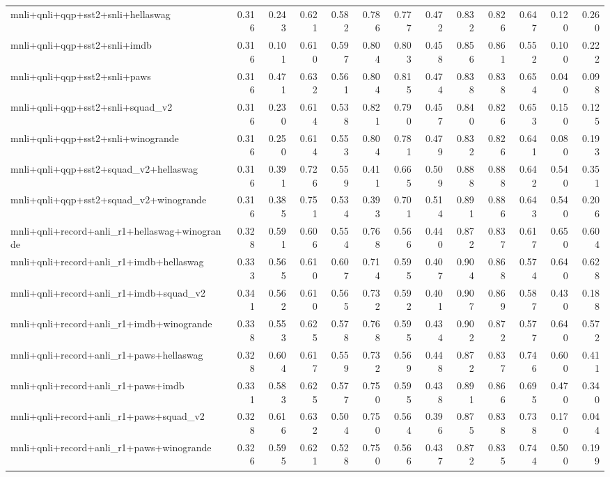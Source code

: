 \begin{table}[t]
\begin{tabular}{lrrrrrrrrrrrr}
    mnli+qnli+qqp+sst2+snli+hellaswag & 0.316 & 0.243 & 0.621 & 0.582 & 0.786 & 0.777 & 0.472 & 0.832 & 0.826 & 0.647 & 0.120 & 0.260 \\
    mnli+qnli+qqp+sst2+snli+imdb & 0.316 & 0.101 & 0.610 & 0.597 & 0.804 & 0.803 & 0.458 & 0.856 & 0.861 & 0.552 & 0.100 & 0.222 \\
    mnli+qnli+qqp+sst2+snli+paws & 0.316 & 0.471 & 0.632 & 0.561 & 0.804 & 0.815 & 0.474 & 0.838 & 0.838 & 0.654 & 0.040 & 0.098 \\
    mnli+qnli+qqp+sst2+snli+squad\_v2 & 0.316 & 0.230 & 0.614 & 0.538 & 0.821 & 0.790 & 0.457 & 0.840 & 0.826 & 0.653 & 0.150 & 0.125 \\
    mnli+qnli+qqp+sst2+snli+winogrande & 0.316 & 0.250 & 0.614 & 0.553 & 0.804 & 0.781 & 0.479 & 0.832 & 0.826 & 0.641 & 0.080 & 0.193 \\
    mnli+qnli+qqp+sst2+squad\_v2+hellaswag & 0.316 & 0.391 & 0.726 & 0.559 & 0.411 & 0.665 & 0.509 & 0.888 & 0.888 & 0.642 & 0.540 & 0.351 \\
    mnli+qnli+qqp+sst2+squad\_v2+winogrande & 0.316 & 0.385 & 0.751 & 0.534 & 0.393 & 0.701 & 0.514 & 0.891 & 0.886 & 0.643 & 0.540 & 0.206 \\
    mnli+qnli+record+anli\_r1+hellaswag+winogrande & 0.328 & 0.591 & 0.606 & 0.554 & 0.768 & 0.566 & 0.440 & 0.872 & 0.837 & 0.617 & 0.650 & 0.604 \\
    mnli+qnli+record+anli\_r1+imdb+hellaswag & 0.333 & 0.565 & 0.610 & 0.607 & 0.714 & 0.595 & 0.407 & 0.904 & 0.868 & 0.574 & 0.640 & 0.628 \\
    mnli+qnli+record+anli\_r1+imdb+squad\_v2 & 0.341 & 0.562 & 0.610 & 0.565 & 0.732 & 0.592 & 0.401 & 0.907 & 0.869 & 0.587 & 0.430 & 0.188 \\
    mnli+qnli+record+anli\_r1+imdb+winogrande & 0.338 & 0.553 & 0.625 & 0.578 & 0.768 & 0.595 & 0.434 & 0.902 & 0.872 & 0.577 & 0.640 & 0.572 \\
    mnli+qnli+record+anli\_r1+paws+hellaswag & 0.328 & 0.604 & 0.617 & 0.559 & 0.732 & 0.569 & 0.448 & 0.872 & 0.837 & 0.746 & 0.600 & 0.411 \\
    mnli+qnli+record+anli\_r1+paws+imdb & 0.331 & 0.583 & 0.625 & 0.577 & 0.750 & 0.595 & 0.438 & 0.891 & 0.866 & 0.695 & 0.470 & 0.340 \\
    mnli+qnli+record+anli\_r1+paws+squad\_v2 & 0.328 & 0.616 & 0.632 & 0.504 & 0.750 & 0.564 & 0.396 & 0.875 & 0.838 & 0.738 & 0.170 & 0.044 \\
    mnli+qnli+record+anli\_r1+paws+winogrande & 0.326 & 0.595 & 0.621 & 0.528 & 0.750 & 0.566 & 0.437 & 0.872 & 0.835 & 0.744 & 0.500 & 0.199 \\

\end{tabular}
\end{table}
